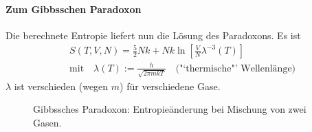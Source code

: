 \paragraph{Zum Gibbsschen Paradoxon}

Die berechnete Entropie liefert nun die Lösung des Paradoxons. Es ist
\begin{equation}
    \begin{split}
        &  S(T, V, N) = \frac{5}{2} N k + N k \ln \left[ \frac{V}{N} \lambda^{-3}(T) \right] \\
        & \text{mit} \quad \lambda(T) := \frac{h}{\sqrt{2 \pi m k T}} \quad \text{("`thermische"' Wellenlänge)}
    \end{split}
\end{equation}
$\lambda$ ist verschieden (wegen $m$) für verschiedene Gase.

\begin{figure}[H]
    \centering
    \def\svgwidth{0.5\textwidth}
    
    \caption{Gibbssches Paradoxon: Entropieänderung bei Mischung von zwei Gasen.}
    \label{img:gibbsParadoxon}
\end{figure}

